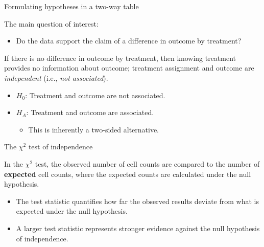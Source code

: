 \documentclass[
  ignorenonframetext,
  aspectratio=169]{beamer}
\providecommand{\tightlist}{%
  \setlength{\itemsep}{0pt}\setlength{\parskip}{0pt}}
\begin{document}
\begin{frame}{Formulating hypotheses in a two-way table}
\protect\hypertarget{formulating-hypotheses-in-a-two-way-table}{}
\small

The main question of interest:

\begin{itemize}
\tightlist
\item
  Do the data support the claim of a difference in outcome by treatment?
\end{itemize}

If there is no difference in outcome by treatment, then knowing
treatment provides no information about outcome; treatment assignment
and outcome are \emph{independent} (i.e., \emph{not associated}).

\begin{itemize}
\item
  \(H_{0}\): Treatment and outcome are not associated.
\item
  \(H_{A}\): Treatment and outcome are associated.

  \begin{itemize}
  \tightlist
  \item
    This is inherently a two-sided alternative.
  \end{itemize}
\end{itemize}
\end{frame}

\begin{frame}{The \(\chi^2\) test of independence}
\protect\hypertarget{the-chi2-test-of-independence}{}
\small

In the \(\chi^2\) test, the observed number of cell counts are compared
to the number of \textbf{expected} cell counts, where the expected
counts are calculated under the null hypothesis.

\begin{itemize}
\item
  The test statistic quantifies how far the observed results deviate
  from what is expected under the null hypothesis.
\item
  A larger test statistic represents stronger evidence against the null
  hypothesis of independence.
\end{itemize}
\end{frame}
\end{document}
